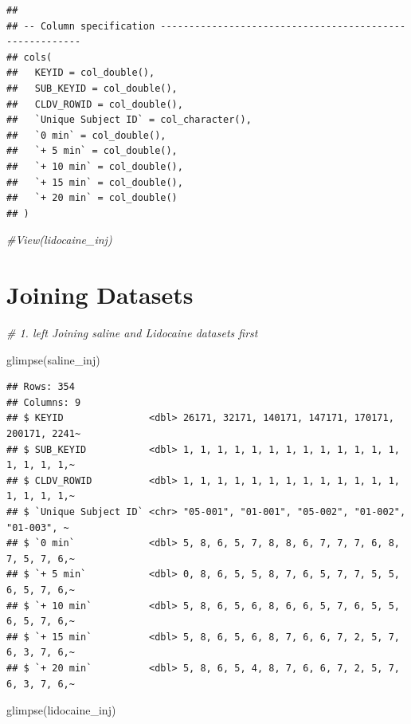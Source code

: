 \documentclass[
]{article}
\newenvironment{Shaded}{\begin{snugshade}}{\end{snugshade}}
\newcommand{\CommentTok}[1]{\textcolor[rgb]{0.56,0.35,0.01}{\textit{#1}}}
\newcommand{\FunctionTok}[1]{\textcolor[rgb]{0.00,0.00,0.00}{#1}}
\newcommand{\NormalTok}[1]{#1}
\begin{document}
\begin{verbatim}
## 
## -- Column specification --------------------------------------------------------
## cols(
##   KEYID = col_double(),
##   SUB_KEYID = col_double(),
##   CLDV_ROWID = col_double(),
##   `Unique Subject ID` = col_character(),
##   `0 min` = col_double(),
##   `+ 5 min` = col_double(),
##   `+ 10 min` = col_double(),
##   `+ 15 min` = col_double(),
##   `+ 20 min` = col_double()
## )
\end{verbatim}

\begin{Shaded}
\begin{Highlighting}[]
\CommentTok{\#View(lidocaine\_inj)}
\end{Highlighting}
\end{Shaded}

\hypertarget{joining-datasets}{%
\section{Joining Datasets}\label{joining-datasets}}

\begin{Shaded}
\begin{Highlighting}[]
\CommentTok{\# 1. left Joining saline and Lidocaine datasets first}

\FunctionTok{glimpse}\NormalTok{(saline\_inj)}
\end{Highlighting}
\end{Shaded}

\begin{verbatim}
## Rows: 354
## Columns: 9
## $ KEYID               <dbl> 26171, 32171, 140171, 147171, 170171, 200171, 2241~
## $ SUB_KEYID           <dbl> 1, 1, 1, 1, 1, 1, 1, 1, 1, 1, 1, 1, 1, 1, 1, 1, 1,~
## $ CLDV_ROWID          <dbl> 1, 1, 1, 1, 1, 1, 1, 1, 1, 1, 1, 1, 1, 1, 1, 1, 1,~
## $ `Unique Subject ID` <chr> "05-001", "01-001", "05-002", "01-002", "01-003", ~
## $ `0 min`             <dbl> 5, 8, 6, 5, 7, 8, 8, 6, 7, 7, 7, 6, 8, 7, 5, 7, 6,~
## $ `+ 5 min`           <dbl> 0, 8, 6, 5, 5, 8, 7, 6, 5, 7, 7, 5, 5, 6, 5, 7, 6,~
## $ `+ 10 min`          <dbl> 5, 8, 6, 5, 6, 8, 6, 6, 5, 7, 6, 5, 5, 6, 5, 7, 6,~
## $ `+ 15 min`          <dbl> 5, 8, 6, 5, 6, 8, 7, 6, 6, 7, 2, 5, 7, 6, 3, 7, 6,~
## $ `+ 20 min`          <dbl> 5, 8, 6, 5, 4, 8, 7, 6, 6, 7, 2, 5, 7, 6, 3, 7, 6,~
\end{verbatim}

\begin{Shaded}
\begin{Highlighting}[]
\FunctionTok{glimpse}\NormalTok{(lidocaine\_inj)}
\end{Highlighting}
\end{Shaded}
\end{document}

